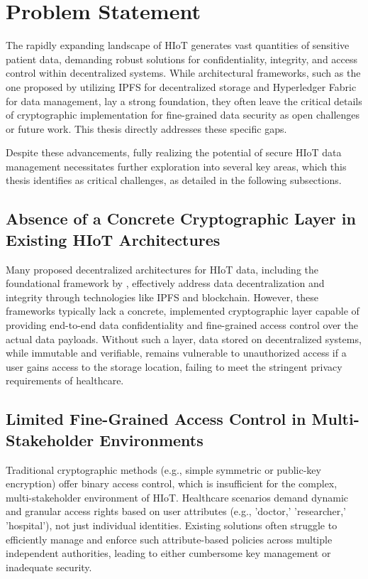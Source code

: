 \documentclass[cic,tc,english]{iiufrgs}
\numberwithin{algorithm}{chapter}
\begin{document}
    \section{Problem Statement}
        \label{sec:problemstatement}

        The rapidly expanding landscape of HIoT generates vast quantities of sensitive patient data, demanding robust solutions for confidentiality, integrity, and access control within decentralized systems. While architectural frameworks, such as the one proposed by \citet{laura2023} utilizing IPFS for decentralized storage and Hyperledger Fabric for data management, lay a strong foundation, they often leave the critical details of cryptographic implementation for fine-grained data security as open challenges or future work. This thesis directly addresses these specific gaps.

        Despite these advancements, fully realizing the potential of secure HIoT data management necessitates further exploration into several key areas, which this thesis identifies as critical challenges, as detailed in the following subsections.

        \subsection{Absence of a Concrete Cryptographic Layer in Existing HIoT Architectures}
            Many proposed decentralized architectures for HIoT data, including the foundational framework by \citet{laura2023}, effectively address data decentralization and integrity through technologies like IPFS and blockchain. However, these frameworks typically lack a concrete, implemented cryptographic layer capable of providing end-to-end data confidentiality and fine-grained access control over the actual data payloads. Without such a layer, data stored on decentralized systems, while immutable and verifiable, remains vulnerable to unauthorized access if a user gains access to the storage location, failing to meet the stringent privacy requirements of healthcare.

        \subsection{Limited Fine-Grained Access Control in Multi-Stakeholder Environments}
            Traditional cryptographic methods (e.g., simple symmetric or public-key encryption) offer binary access control, which is insufficient for the complex, multi-stakeholder environment of HIoT. Healthcare scenarios demand dynamic and granular access rights based on user attributes (e.g., 'doctor,' 'researcher,' 'hospital'), not just individual identities. Existing solutions often struggle to efficiently manage and enforce such attribute-based policies across multiple independent authorities, leading to either cumbersome key management or inadequate security.
\end{document}
